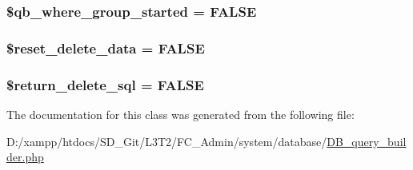 \subsubsection[{\$qb\+\_\+where\+\_\+group\+\_\+started}]{\setlength{\rightskip}{0pt plus 5cm}\$qb\+\_\+where\+\_\+group\+\_\+started = F\+A\+L\+S\+E\hspace{0.3cm}{\ttfamily [protected]}}\label{class_c_i___d_b__query__builder_aaae9d24ab424373f1bdbc1b601074433}
\hypertarget{class_c_i___d_b__query__builder_aaeed877e8b1faeddaecaec6c890567ef}{}
\subsubsection[{\$reset\+\_\+delete\+\_\+data}]{\setlength{\rightskip}{0pt plus 5cm}\$reset\+\_\+delete\+\_\+data = F\+A\+L\+S\+E\hspace{0.3cm}{\ttfamily [protected]}}\label{class_c_i___d_b__query__builder_aaeed877e8b1faeddaecaec6c890567ef}
\hypertarget{class_c_i___d_b__query__builder_aee0c1cc88062e1b49fe9e057bfb288e6}{}
\subsubsection[{\$return\+\_\+delete\+\_\+sql}]{\setlength{\rightskip}{0pt plus 5cm}\$return\+\_\+delete\+\_\+sql = F\+A\+L\+S\+E\hspace{0.3cm}{\ttfamily [protected]}}\label{class_c_i___d_b__query__builder_aee0c1cc88062e1b49fe9e057bfb288e6}


The documentation for this class was generated from the following file\+:\begin{DoxyCompactItemize}
\item 
D\+:/xampp/htdocs/\+S\+D\+\_\+\+Git/\+L3\+T2/\+F\+C\+\_\+\+Admin/system/database/\hyperlink{_d_b__query__builder_8php}{D\+B\+\_\+query\+\_\+builder.\+php}\end{DoxyCompactItemize}
